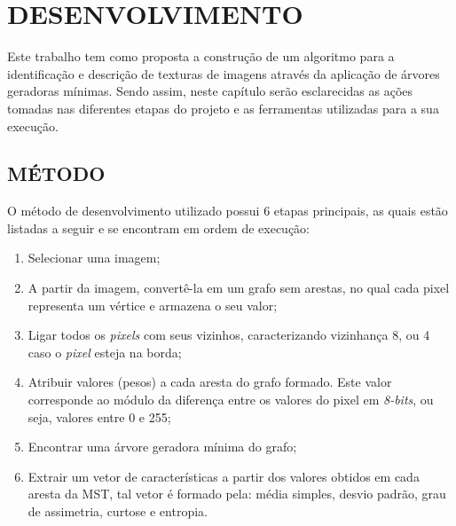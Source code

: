 
\chapter{DESENVOLVIMENTO}
\label{chap:proposta}

\par Este trabalho tem como proposta a construção de um algoritmo para a identificação e descrição de texturas de imagens através da aplicação de árvores geradoras mínimas. Sendo assim, neste capítulo serão esclarecidas as ações tomadas nas diferentes etapas do projeto e as ferramentas utilizadas para a sua execução.

\section{MÉTODO}
\label{sec:metodo}

\par O método de desenvolvimento utilizado possui 6 etapas principais, as quais estão listadas a seguir e se encontram em ordem de execução:

\begin{enumerate}
    \item Selecionar uma imagem;
    \item A partir da imagem, convertê-la em um grafo sem arestas, no qual cada pixel representa um vértice e armazena o seu valor;
    \item Ligar todos os \textit{pixels} com seus vizinhos, caracterizando vizinhança 8, ou 4 caso o \textit{pixel} esteja na borda;
    \item Atribuir valores (pesos) a cada aresta do grafo formado. Este valor corresponde ao módulo da diferença entre os valores do pixel em \textit{8-bits}, ou seja, valores entre 0 e 255;
    \item Encontrar uma árvore geradora mínima do grafo;
    \item Extrair um vetor de características a partir dos valores obtidos em cada aresta da MST, tal vetor é formado pela: média simples, desvio padrão, grau de assimetria, curtose e entropia.
\end{enumerate}

